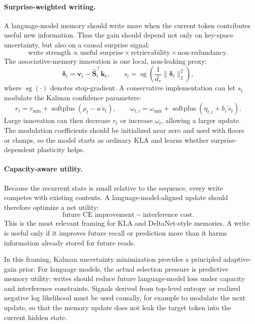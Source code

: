 \documentclass[11pt]{article}
\newcommand{\ve}[1]{\boldsymbol{#1}}
\newcommand{\tr}{\intercal}
\begin{document}
\paragraph{Surprise-weighted writing.}
A language-model memory should write more when the current token contributes useful new
information. Thus the gain should depend not only on key-space uncertainty, but also on a
causal surprise signal:
\[
  \text{write strength}
  \propto
  \text{useful surprise}
  \times
  \text{retrievability}
  \times
  \text{non-redundancy}.
\]
The associative-memory innovation is one local, non-leaking proxy:
\[
  \ve{\delta}_t
  =
  \ve{v}_t-\widehat{\ve{S}}_t^{\tr}\ve{k}_t,
  \qquad
  s_t
  =
  \operatorname{sg}\!\left(
    \frac{1}{d_v}\|\ve{\delta}_t\|_2^2
  \right),
\]
where $\operatorname{sg}(\cdot)$ denotes stop-gradient. A conservative implementation can
let $s_t$ modulate the Kalman confidence parameters:
\[
  r_t
  =
  r_{\min}+\operatorname{softplus}(\rho_t-a\,\widetilde{s}_t),
  \qquad
  \omega_{t,i}
  =
  \omega_{\min}+\operatorname{softplus}(\eta_{t,i}+b_i\,\widetilde{s}_t).
\]
Large innovation can then decrease $r_t$ or increase $\omega_t$, allowing a larger update.
The modulation coefficients should be initialized near zero and used with floors or clamps,
so the model starts as ordinary KLA and learns whether surprise-dependent plasticity helps.

\paragraph{Capacity-aware utility.}
Because the recurrent state is small relative to the sequence, every write competes with
existing contents. A language-model-aligned update should therefore optimize a net utility:
\[
  \text{future CE improvement}
  -
  \text{interference cost}.
\]
This is the most relevant framing for KLA and DeltaNet-style memories. A write is useful
only if it improves future recall or prediction more than it harms information already stored
for future reads.

In this framing, Kalman uncertainty minimization provides a principled adaptive-gain prior.
For language models, the actual selection pressure is predictive memory utility: writes
should reduce future language-model loss under capacity and interference constraints.
Signals derived from top-level entropy or realized negative log likelihood must be used
causally, for example to modulate the next update, so that the memory update does not leak
the target token into the current hidden state.
\end{document}
